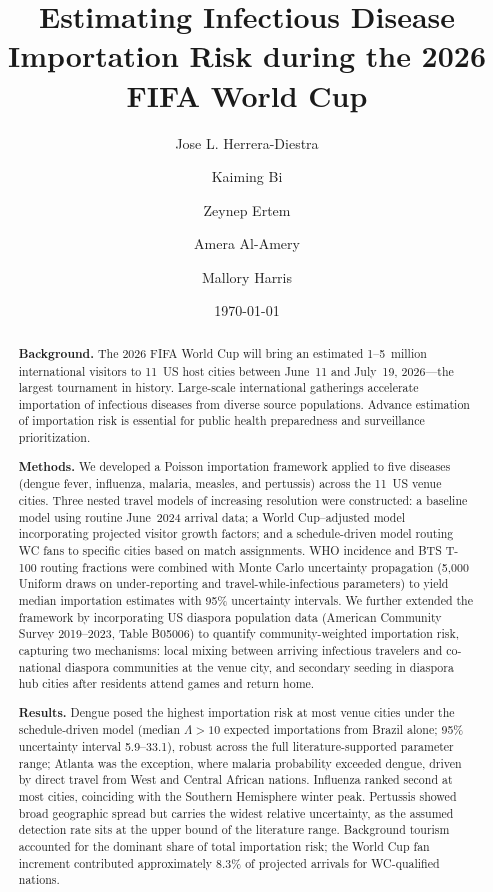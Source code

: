 \documentclass[12pt]{article}
\title{\textbf{Estimating Infectious Disease Importation Risk
during the 2026 FIFA World Cup}}
\author[1]{Jose L. Herrera-Diestra}
\author[2]{Kaiming Bi}
\author[4]{Zeynep Ertem}
\author[5]{Amera Al-Amery}
\author[3]{Mallory Harris}
\affil[1]{Tarleton State University, Stephenville, TX, USA}
\affil[2]{UTHealth Houston, Houston, TX, USA}
\affil[3]{University of Texas at Austin, Austin, TX, USA}
\affil[4]{Binghamton University, Binghamton, NY, USA}
\affil[5]{Jordan University of Science and Technology, Irbid, Jordan}
\date{\today}
\begin{document}
\maketitle
\linenumbers

\begin{abstract}
\noindent\textbf{Background.}
The 2026 FIFA World Cup will bring an estimated 1--5~million
international visitors to 11~US host cities between June~11 and
July~19, 2026---the largest tournament in history. Large-scale
international gatherings accelerate importation of infectious
diseases from diverse source populations. Advance estimation of
importation risk is essential for public health preparedness and
surveillance prioritization.

\medskip
\noindent\textbf{Methods.}
We developed a Poisson importation framework applied to five
diseases (dengue fever, influenza, malaria, measles, and pertussis)
across the 11~US venue cities. Three nested travel models of
increasing resolution were constructed: a baseline model using
routine June~2024 arrival data; a World Cup--adjusted model
incorporating projected visitor growth factors; and a
schedule-driven model routing WC fans to specific cities based on
match assignments. WHO incidence and BTS T-100 routing fractions were
combined with Monte Carlo uncertainty propagation (5,000 Uniform
draws on under-reporting and travel-while-infectious parameters)
to yield median importation estimates with 95\% uncertainty
intervals. We further extended the framework by incorporating
US diaspora population data (American Community Survey 2019--2023,
Table B05006) to quantify community-weighted importation risk,
capturing two mechanisms: local mixing between arriving infectious
travelers and co-national diaspora communities at the venue city, and
secondary seeding in diaspora hub cities after residents attend games
and return home.

\medskip
\noindent\textbf{Results.}
Dengue posed the highest importation risk at most venue cities under
the schedule-driven model (median $\Lambda > 10$ expected importations
from Brazil alone; 95\% uncertainty interval 5.9--33.1), robust across the full literature-supported parameter range;
Atlanta was the exception, where malaria probability exceeded dengue,
driven by direct travel from West and Central African nations.
Influenza ranked second at most cities, coinciding with the Southern
Hemisphere winter peak. Pertussis showed broad geographic spread but
carries the widest relative uncertainty, as the assumed detection rate
sits at the upper bound of the literature range. Background tourism
accounted for the dominant share of total importation risk; the World
Cup fan increment contributed approximately 8.3\% of projected arrivals
for WC-qualified nations.


\end{abstract}
\end{document}
